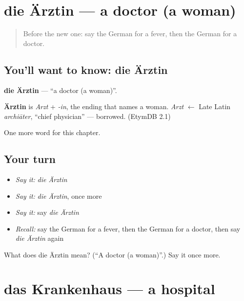 \section[die Ärztin]{die Ärztin — a doctor (a woman)}

\label{lesson:GE-C59-aerztin}



\begin{quote}
Before the new one: say the German for a fever, then the German for a doctor.
\end{quote}

\subsection*{You'll want to know: die Ärztin}
\textbf{die Ärztin} — \textquotedblleft{}a doctor (a woman)\textquotedblright{}.

\begin{cousinweb}
\textbf{Ärztin} is \emph{Arzt} + \emph{-in}, the ending that names a woman. \emph{Arzt} $\leftarrow$ Late Latin \emph{archiāter}, \textquotedblleft{}chief physician\textquotedblright{} — borrowed. (EtymDB 2.1)
\end{cousinweb}

\begin{grammarlens}[title={What you've built}]
One more word for this chapter.
\end{grammarlens}

\subsection*{Your turn}
\begin{itemize}
\raggedright
  \item \emph{Say it:} \emph{die Ärztin}
  \item \emph{Say it:} \emph{die Ärztin}, once more
  \item \emph{Say it:} say \emph{die Ärztin}
  \item \emph{Recall:} say the German for a fever, then the German for a doctor, then say \emph{die Ärztin} again
\end{itemize}

\begin{tcolorbox}[breakable,colback=teal!4,colframe=teal!35!black,title={Before you move on}]
What does die Ärztin mean? (\textquotedblleft{}A doctor (a woman)\textquotedblright{}.) Say it once more.
\end{tcolorbox}
\section[das Krankenhaus]{das Krankenhaus — a hospital}


